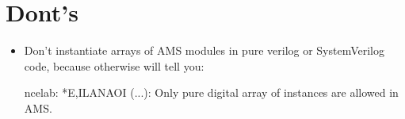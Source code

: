\section{Dont's}
\begin{itemize}
	\item Don't instantiate arrays of AMS modules in pure verilog or SystemVerilog code, because otherwise  will tell you:
\begin{lstbashplain}
ncelab: *E,ILANAOI (...): Only pure digital array of instances are allowed in AMS.
\end{lstbashplain}
\end{itemize}
